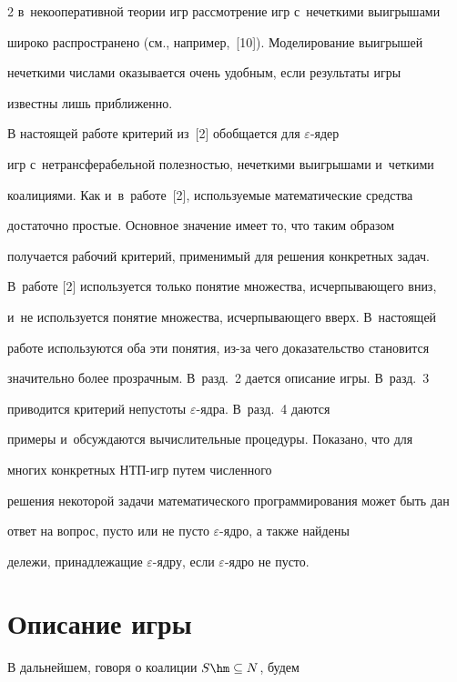 \begin{multicols}{2}
в~некооперативной теории игр рассмотрение игр с~нечеткими выигрышами 

широко распространено (см., например,~[10]). Моделирование выигрышей 

нечеткими числами оказывается очень удобным, если результаты игры 

известны лишь при\-бли\-женно.



    В настоящей работе критерий из~[2] обобщается для $\varepsilon$-ядер 

игр с~нетрансферабельной полезностью, нечеткими выигрышами и~четкими 

коалициями. Как и~в~работе~[2], используемые математические средства 

достаточно простые. Основное значение имеет то, что таким образом 

получается рабочий критерий, применимый для решения конкретных задач. 

В~работе [2] используется только понятие множества, исчерпывающего вниз, 

и~не используется понятие множества, исчерпывающего вверх. В~настоящей 

работе используются оба эти понятия, из-за чего доказательство становится 

значительно более прозрачным. В~разд.~2 дается описание игры. В~разд.~3 

приводится критерий непустоты $\varepsilon$-яд\-ра. В~разд.~4 даются 

примеры и~обсуждаются вычислительные процедуры. Показано, что для 

многих конкретных НТП-игр путем численного 

решения некоторой задачи математического программирования может быть дан 

ответ на вопрос, пусто или не пусто $\varepsilon$-яд\-ро, а также найдены 

дележи, принадлежащие $\varepsilon$-яд\-ру, если $\varepsilon$-яд\-ро не пусто.



\section{Описание игры}



\vspace*{-20pt}



    В дальнейшем, говоря о коалиции $S\hm\subseteq N$, будем 


\end{multicols}
